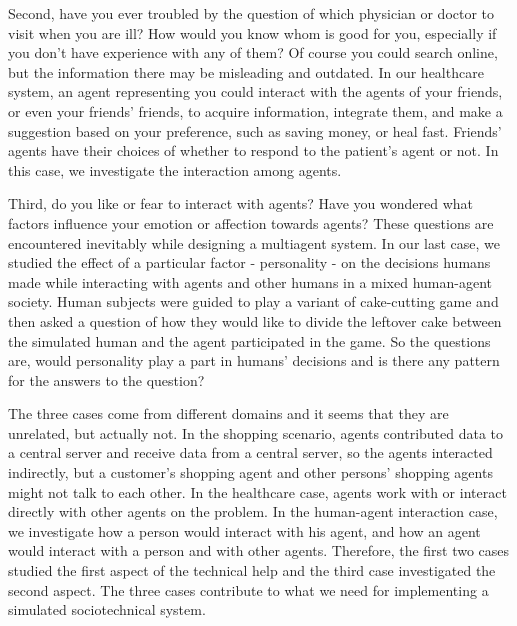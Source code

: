 Second, have you ever troubled by the question of which physician or doctor to visit when you are ill? How would you know whom is good for you, especially if you don't have experience with any of them? Of course you could search online, but the information there may be misleading and outdated. In our healthcare system, an agent representing you could interact with the agents of your friends, or even your friends' friends, to acquire information, integrate them, and make a suggestion based on your preference, such as saving money, or heal fast. Friends' agents have their choices of whether to respond to the patient's agent or not. In this case, we investigate the interaction among agents.  

Third, do you like or fear to interact with agents? Have you wondered what factors influence your emotion or affection towards agents? These questions are encountered inevitably while designing a multiagent system. In our last case, we studied the effect of a particular factor - personality - on the decisions humans made while interacting with agents and other humans in a mixed human-agent society. Human subjects were guided to play a variant of cake-cutting game and then asked a question of how they would like to divide the leftover cake between the simulated human and the agent participated in the game. So the questions are, would personality play a part in humans' decisions and is there any pattern for the answers to the question?

The three cases come from different domains and it seems that they are unrelated, but actually not. In the shopping scenario, agents contributed data to a central server and receive data from a central server, so the agents interacted indirectly, but a customer's shopping agent and other persons' shopping agents might not talk to each other. In the healthcare case, agents work with or interact directly with other agents on the problem. In the human-agent interaction case, we investigate how a person would interact with his agent, and how an agent would interact with a person and with other agents. Therefore, the first two cases studied the first aspect of the technical help and the third case investigated the second aspect. The three cases contribute to what we need for implementing a simulated sociotechnical system. 
  

